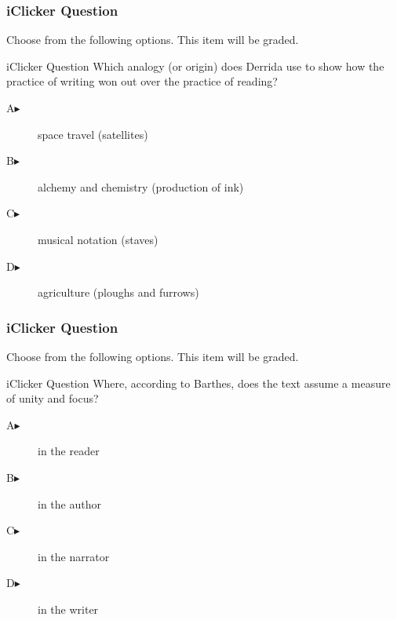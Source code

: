 \documentclass[xcolor=dvipsnames]{beamer}
\begin{document}
\begin{frame}
  \frametitle{iClicker Question}
Choose from the following options. This item will be graded.
\begin{block}{iClicker Question}
Which analogy (or origin) does Derrida use to show how the practice of
writing won out over the practice of reading?
\end{block}
\begin{description}
\item[A\hspace{.2in}$\blacktriangleright$] space travel (satellites)
\item[B\hspace{.2in}$\blacktriangleright$] alchemy and chemistry (production of ink)
\item[C\hspace{.2in}$\blacktriangleright$] musical notation (staves)
\item[D\hspace{.2in}$\blacktriangleright$] agriculture (ploughs and furrows)
\end{description}
\end{frame}

\begin{frame}
  \frametitle{iClicker Question}
Choose from the following options. This item will be graded.
\begin{block}{iClicker Question}
Where, according to Barthes, does the text assume a measure of unity
and focus?
\end{block}
\begin{description}
\item[A\hspace{.2in}$\blacktriangleright$] in the reader
\item[B\hspace{.2in}$\blacktriangleright$] in the author
\item[C\hspace{.2in}$\blacktriangleright$] in the narrator
\item[D\hspace{.2in}$\blacktriangleright$] in the writer
\end{description}
\end{frame}
\end{document}
